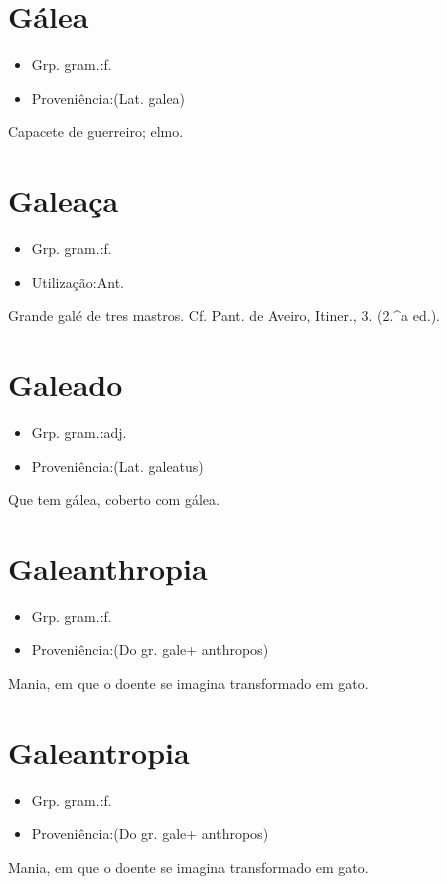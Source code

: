 \section{Gálea}
\begin{itemize}
\item {Grp. gram.:f.}
\end{itemize}
\begin{itemize}
\item {Proveniência:(Lat. \textunderscore galea\textunderscore )}
\end{itemize}
Capacete de guerreiro; elmo.
\section{Galeaça}
\begin{itemize}
\item {Grp. gram.:f.}
\end{itemize}
\begin{itemize}
\item {Utilização:Ant.}
\end{itemize}
Grande galé de tres mastros. Cf. Pant. de Aveiro, \textunderscore Itiner.\textunderscore , 3. (2.^a ed.).
\section{Galeado}
\begin{itemize}
\item {Grp. gram.:adj.}
\end{itemize}
\begin{itemize}
\item {Proveniência:(Lat. \textunderscore galeatus\textunderscore )}
\end{itemize}
Que tem gálea, coberto com gálea.
\section{Galeanthropia}
\begin{itemize}
\item {Grp. gram.:f.}
\end{itemize}
\begin{itemize}
\item {Proveniência:(Do gr. \textunderscore gale\textunderscore  + \textunderscore anthropos\textunderscore )}
\end{itemize}
Mania, em que o doente se imagina transformado em gato.
\section{Galeantropia}
\begin{itemize}
\item {Grp. gram.:f.}
\end{itemize}
\begin{itemize}
\item {Proveniência:(Do gr. \textunderscore gale\textunderscore  + \textunderscore anthropos\textunderscore )}
\end{itemize}
Mania, em que o doente se imagina transformado em gato.
